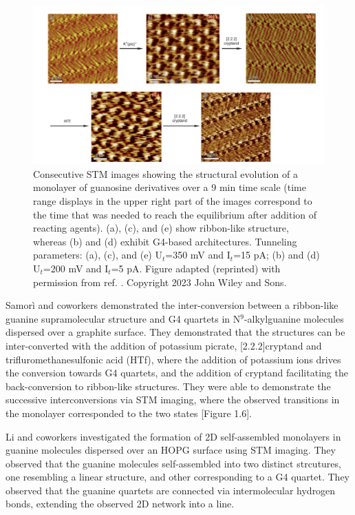 \begin{figure}
    \centering
    \includegraphics[width=\textwidth]{Introduction/Figures/Figure5.png}
    \caption[STM images demonstrating the structural evolution of monolayer of guanosine derivatives over graphene surface]{Consecutive STM images showing the structural evolution of a monolayer of guanosine derivatives over a 9 min time scale (time range displays in the upper right part of the images correspond to the time that was needed to reach the equilibrium after addition of reacting agents). (a), (c), and (e) show ribbon-like structure, whereas (b) and (d) exhibit G4-based architectures. Tunneling parameters: (a), (c), and (e) U$_t$=350 mV and I$_t$=15 pA; (b) and (d) U$_t$=200 mV and I$_t$=5 pA. Figure adapted (reprinted) with permission from ref. \supercite{ciesielski_dynamers_2010}. Copyright 2023 John Wiley and Sons.}
    \label{fig:figure6}
\end{figure}

Samor\`{i} and coworkers demonstrated the inter-conversion between a ribbon-like guanine supramolecular structure and G4 quartets in N$^9$-alkylguanine molecules dispersed over a graphite surface\supercite{ciesielski_dynamers_2010}. They demonstrated that the structures can be inter-converted with the addition of potassium picrate, [2.2.2]cryptand and trifluromethanesulfonic acid (HTf), where the addition of potassium ions drives the conversion towards G4 quartets, and the addition of cryptand facilitating the back-conversion to ribbon-like structures. They were able to demonstrate the successive interconversions via STM imaging, where the observed transitions in the monolayer corresponded to the two states [Figure 1.6].

Li and coworkers investigated the formation of 2D self-assembled monolayers in guanine molecules dispersed over an HOPG surface using STM imaging\supercite{xu_directional_2021}. They observed that the guanine molecules self-assembled into two distinct strcutures, one resembling a linear structure, and other corresponding to a G4 quartet. They observed that the guanine quartets are connected via intermolecular hydrogen bonds, extending the observed 2D network into a line.

